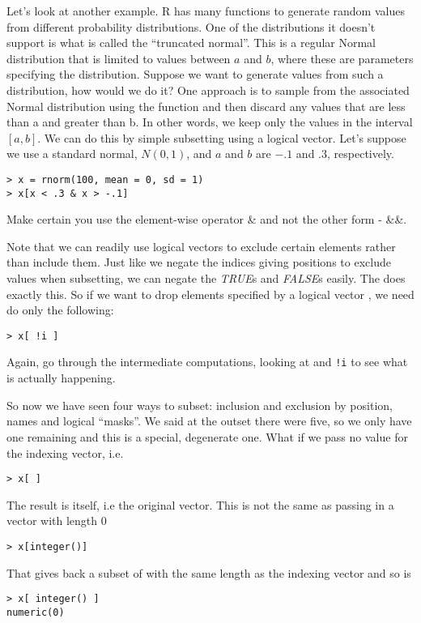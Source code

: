 Let's look at another example. R has many functions to generate random
values from different probability distributions. One of the
distributions it doesn't support is what is called the ``truncated
normal''. This is a regular Normal distribution that is limited to
values between $a$ and $b$, where these are parameters specifying the
distribution. Suppose we want to generate values from such a
distribution, how would we do it? One approach is to sample from the
associated Normal distribution using the  function
and then discard any values that are less than a and greater than
b. In other words, we keep only the values in the interval $[a, b]$. We
can do this by simple subsetting using a logical vector. Let's suppose
we use a standard normal, $N(0, 1)$, and $a$ and $b$ are $-.1$ and $.3$,
respectively.
\begin{verbatim}
> x = rnorm(100, mean = 0, sd = 1)
> x[x < .3 & x > -.1] 
\end{verbatim}
Make certain you use the element-wise operator \& and not the other
form - \&\&.

Note that we can readily use logical vectors to exclude certain
elements rather than include them. Just like we negate the indices
giving positions to exclude values when subsetting, we can negate the
\textsl{TRUE}s and \textsl{FALSE}s easily. The \SOperator{!} does
exactly this. So if we want to drop elements specified by a logical
vector , we need do only the following:
\begin{verbatim}
> x[ !i ]
\end{verbatim}
Again, go through the intermediate computations, looking at
 and \verb|!i| to see what is actually happening.

So now we have seen four ways to subset: inclusion and exclusion by
position, names and logical ``masks''. We said at the outset there were
five, so we only have one remaining and this is a special, degenerate
one. What if we pass no value for the indexing vector, i.e.
\begin{verbatim}
> x[ ]
\end{verbatim}
The result is  itself, i.e the original vector. This is
not the same as passing in a vector with length 0
\begin{verbatim}
> x[integer()]
\end{verbatim}
That gives back a subset of  with the same length as the
indexing vector and so is
\begin{verbatim}
> x[ integer() ]
numeric(0)
\end{verbatim}


